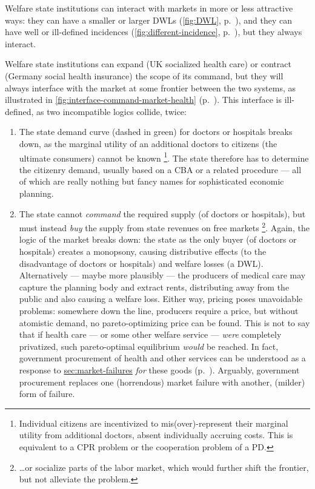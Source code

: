 Welfare state institutions can interact with markets in more or less attractive ways: they can have a smaller or larger \glspl{DWL} (\autoref{fig:DWL}, p.~\pageref{fig:DWL}), and they can have well or ill-defined incidences (\autoref{fig:different-incidence}, p.~\pageref{fig:different-incidence}), but they always interact.%

Welfare state institutions can expand (UK socialized health care) or contract (Germany social health insurance) the scope of its command, but they will always interface with the market at some frontier between the two systems, as illustrated in \autoref{fig:interface-command-market-health} (p.~\pageref{fig:interface-command-market-health}). 
This interface is ill-defined, as two incompatible logics collide, twice: 

\begin{enumerate}
	\item 
		The state demand curve (dashed in green) for doctors or hospitals breaks down, as the marginal utility of an additional doctors to citizens (the ultimate consumers) cannot be known	
		\footnote{
			Individual citizens are incentivized to mis(over)-represent their marginal utility from additional doctors, absent individually accruing costs. 
			This is equivalent to a \gls{CPR} problem or the cooperation problem of a \gls{PD}.
		}. 
		The state therefore has to determine the citizenry demand, usually based on a \gls{CBA} or a related procedure --- all of which are really nothing but fancy names for sophisticated economic planning.
	\item 
		The state cannot \emph{command} the required supply (of doctors or hospitals), but must instead \emph{buy} the supply from state revenues on free markets
		\footnote{
			\ldots or socialize parts of the labor market, which would further shift the frontier, but not alleviate the problem.
		}. 
		Again, the logic of the market breaks down: the state as the only buyer (of doctors or hospitals) creates a monopsony, causing distributive effects (to the disadvantage of doctors or hospitals) and welfare losses (a \gls{DWL}).
		Alternatively --- maybe more plausibly --- the producers of medical care may capture the planning body and extract rents, distributing away from the public and also causing a welfare loss.
		Either way, pricing poses unavoidable problems: somewhere down the line, producers require a price, but without atomistic demand, no pareto-optimizing price can be found.
		This is not to say that if health care --- or some other welfare service --- \emph{were} completely privatized, such pareto-optimal equilibrium \emph{would} be reached.
		In fact, government procurement of health and other services can be understood as a response to \hyperref[failed atomistic markets]{sec:market-failures} \emph{for} these goods (p.~\pageref{sec:market-failures}).
		Arguably, government procurement replaces one (horrendous) market failure with another, (milder) form of failure.
\end{enumerate}

